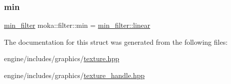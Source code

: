 \mbox{\label{structmoka_1_1filter_a1e278f0f9dfb7f1da5f3480ffebcf941}} 
\subsubsection{\texorpdfstring{min}{min}}
{\footnotesize\ttfamily \mbox{\hyperlink{namespacemoka_afeea6a53d61ee8561c91c62f5a051a77}{min\+\_\+filter}} moka\+::filter\+::min = \mbox{\hyperlink{namespacemoka_a2391e4ae99494b70d0226ee0e586f33ca9a932b3cb396238423eb2f33ec17d6aa}{min\+\_\+filter\+::linear}}}



The documentation for this struct was generated from the following files\+:\begin{DoxyCompactItemize}
\item 
engine/includes/graphics/\mbox{\hyperlink{texture_8hpp}{texture.\+hpp}}\item 
engine/includes/graphics/\mbox{\hyperlink{texture__handle_8hpp}{texture\+\_\+handle.\+hpp}}\end{DoxyCompactItemize}
